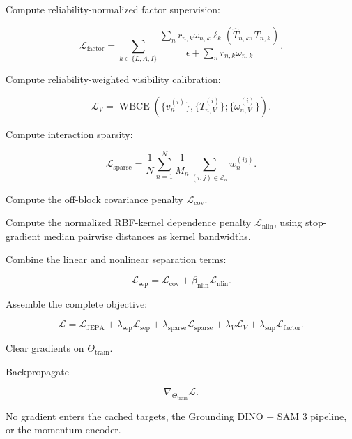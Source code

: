 \begin{tcolorbox}
\begin{algsteps}
\item
Compute reliability-normalized factor supervision:

\[
\mathcal L_{\mathrm{factor}}
=
\sum_{k\in\{L,A,I\}}
\frac{
\sum_n
r_{n,k}\omega_{n,k}
\ell_k
\left(
\widehat T_{n,k},T_{n,k}
\right)
}{
\epsilon+
\sum_n
r_{n,k}\omega_{n,k}
}.
\]

\item
Compute reliability-weighted visibility calibration:

\[
\mathcal L_V
=
\operatorname{WBCE}
\left(
\{v_n^{(i)}\},
\{T_{n,V}^{(i)}\};
\{\omega_{n,V}^{(i)}\}
\right).
\]

\item
Compute interaction sparsity:

\[
\mathcal L_{\mathrm{sparse}}
=
\frac{1}{N}
\sum_{n=1}^{N}
\frac{1}{M_n}
\sum_{(i,j)\in\mathcal E_n}
w_n^{(ij)}.
\]

\item
Compute the off-block covariance penalty
\(\mathcal L_{\mathrm{cov}}\).

\item
Compute the normalized RBF-kernel dependence penalty
\(\mathcal L_{\mathrm{nlin}}\), using stop-gradient median pairwise
distances as kernel bandwidths.

\item
Combine the linear and nonlinear separation terms:

\[
\mathcal L_{\mathrm{sep}}
=
\mathcal L_{\mathrm{cov}}
+
\beta_{\mathrm{nlin}}
\mathcal L_{\mathrm{nlin}}.
\]

\item
Assemble the complete objective:

\[
\mathcal L
=
\mathcal L_{\mathrm{JEPA}}
+
\lambda_{\mathrm{sep}}\mathcal L_{\mathrm{sep}}
+
\lambda_{\mathrm{sparse}}\mathcal L_{\mathrm{sparse}}
+
\lambda_V\mathcal L_V
+
\lambda_{\mathrm{sup}}\mathcal L_{\mathrm{factor}}.
\]


\item
Clear gradients on \(\Theta_{\mathrm{train}}\).

\item
Backpropagate

\[
\nabla_{\Theta_{\mathrm{train}}}\mathcal L.
\]

No gradient enters the cached targets, the Grounding DINO + SAM 3 pipeline, or the momentum encoder.


\end{algsteps}
\end{tcolorbox}
